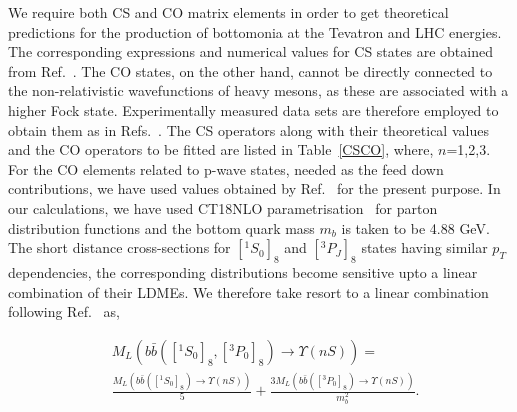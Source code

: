 We require both CS and CO matrix elements in order to get theoretical
predictions for the production of bottomonia at the Tevatron and LHC energies.
The corresponding expressions and
numerical values for CS states are obtained from Ref.~\cite{Brateen:PRD2001}.
The CO states, on the other hand, cannot be directly connected to the non-relativistic
wavefunctions of heavy mesons,
as these are associated with a higher Fock state. Experimentally measured data sets are 
therefore employed to obtain them as in Refs.~\cite{Brateen:PRD2001,Cho:1995vh,Cho:1995ce}. 
The CS operators along with their theoretical values
and the CO operators to be fitted are listed in Table~\ref{CSCO},
where, $n$=1,2,3. For the CO elements related to p-wave states, needed as the 
feed down contributions, we have used values obtained by Ref.~\cite{Sharma:2012dy,Feng:2015wka} for the 
present purpose. In our calculations, we have used
CT18NLO parametrisation~\cite{Hou:2019efy} for parton distribution functions and 
the bottom quark mass $m_b$ is taken to be 4.88 GeV.
The short distance cross-sections for $[^1S_0]_8$ and $[^3P_J]_8$ states having similar 
$p_T$ dependencies, the corresponding distributions become sensitive upto a linear combination
of their LDMEs. We therefore take resort to a linear combination following
Ref.~\cite{Kumar:2016ojy} as,

\begin{equation*}
  \begin{split}
    & M_L(b\bar{b}([^1S_0]_8,[^3P_0]_8)\rightarrow\Upsilon(nS)) = \\
    &\frac{M_L(b\bar{b}([^1S_0]_8)\rightarrow\Upsilon(nS))}{5} +\frac{3 M_L(b\bar{b}([^3P_0]_8)\rightarrow\Upsilon(nS))}{m_b^2}.\\
  \end{split}
\end{equation*}






